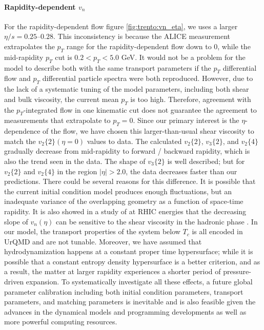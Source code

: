 \paragraph{Rapidity-dependent $v_n$} For the rapidity-dependent flow figure \ref{fig:trento:vn_eta}, we uses a larger $\eta/s=0.25$--$0.28$. 
This inconsistency is because the ALICE measurement extrapolates the $p_T$ range for the rapidity-dependent flow down to 0, while the mid-rapidity  $p_T$ cut is $0.2 < p_T < 5.0$ GeV.
It would not be a problem for the model to describe both with the same transport parameters if the $p_T$ differential flow and $p_T$ differential particle spectra were both reproduced.
However, due to the lack of a systematic tuning of the model parameters, including both shear and bulk viscosity, the current mean $p_T$ is too high.
Therefore, agreement with the $p_T$-integrated flow in one kinematic cut does not guarantee the agreement to measurements that extrapolate to $p_T = 0$.
Since our primary interest is the $\eta$-dependence of the flow, we have chosen this larger-than-usual shear viscosity to match the $v_2\{2\}(\eta=0)$ values to data.
The calculated $v_2\{2\}$, $v_3\{2\}$, and $v_2\{4\}$ gradually decrease from mid-rapidity to forward / backward rapidity, which is also the trend seen in the data.
The shape of $v_3\{2\}$ is well described; but for $v_2\{2\}$ and $v_2\{4\}$ in the region $|\eta| > 2.0$, the data decreases faster than our predictions.
There could be several reasons for this difference.
It is possible that the current initial condition model produces enough fluctuations, but an inadequate variance of the overlapping geometry as a function of space-time rapidity.
It is also showed in a study of at RHIC energies that the decreasing slope of $v_n(\eta)$ can be sensitive to the shear viscosity in the hadronic phase \cite{Denicol:2015bnf, Bozek:2010bi}.
In our model, the transport properties of the system below $T_c$ is all encoded in UrQMD and are not tunable. 
Moreover, we have assumed that hydrodynamization happens at a constant proper time hypersurface;
while it is possible that a constant entropy density hypersurface is a better criterion, and as a result, the matter at larger rapidity experiences a shorter period of pressure-driven expansion.
To systematically investigate all these effects, a future global parameter calibration including both initial condition parameters, transport parameters, and matching parameters is inevitable and is also feasible given the advances in the dynamical models and programming developments as well as more powerful computing resources.

